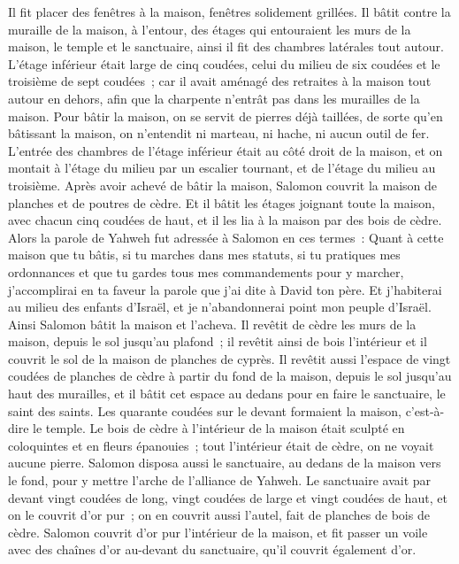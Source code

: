 \begin{multicols}{2}
Il fit placer des fenêtres à la maison, fenêtres solidement grillées.
Il bâtit contre la muraille de la maison, à l'entour, des étages qui entouraient les murs de la maison, le temple et le sanctuaire, ainsi il fit des chambres latérales tout autour.
L'étage inférieur était large de cinq coudées, celui du milieu de six coudées et le troisième de sept coudées~; car il avait aménagé des retraites à la maison tout autour en dehors, afin que la charpente n'entrât pas dans les murailles de la maison.
Pour bâtir la maison, on se servit de pierres déjà taillées, de sorte qu'en bâtissant la maison, on n'entendit ni marteau, ni hache, ni aucun outil de fer.
L'entrée des chambres de l'étage inférieur était au côté droit de la maison, et on montait à l'étage du milieu par un escalier tournant, et de l'étage du milieu au troisième.
Après avoir achevé de bâtir la maison, Salomon couvrit la maison de planches et de poutres de cèdre.
Et il bâtit les étages joignant toute la maison, avec chacun cinq coudées de haut, et il les lia à la maison par des bois de cèdre.
Alors la parole de Yahweh fut adressée à Salomon en ces termes~:
Quant à cette maison que tu bâtis, si tu marches dans mes statuts, si tu pratiques mes ordonnances et que tu gardes tous mes commandements pour y marcher, j'accomplirai en ta faveur la parole que j'ai dite à David ton père.
Et j'habiterai au milieu des enfants d'Israël, et je n'abandonnerai point mon peuple d'Israël.
Ainsi Salomon bâtit la maison et l'acheva.
Il revêtit de cèdre les murs de la maison, depuis le sol jusqu'au plafond~; il revêtit ainsi de bois l'intérieur et il couvrit le sol de la maison de planches de cyprès.
Il revêtit aussi l'espace de vingt coudées de planches de cèdre à partir du fond de la maison, depuis le sol jusqu'au haut des murailles, et il bâtit cet espace au dedans pour en faire le sanctuaire, le saint des saints.
Les quarante coudées sur le devant formaient la maison, c'est-à-dire le temple.
Le bois de cèdre à l'intérieur de la maison était sculpté en coloquintes et en fleurs épanouies~; tout l'intérieur était de cèdre, on ne voyait aucune pierre.
Salomon disposa aussi le sanctuaire, au dedans de la maison vers le fond, pour y mettre l'arche de l'alliance de Yahweh.
Le sanctuaire avait par devant vingt coudées de long, vingt coudées de large et vingt coudées de haut, et on le couvrit d'or pur~; on en couvrit aussi l'autel, fait de planches de bois de cèdre.
Salomon couvrit d'or pur l'intérieur de la maison, et fit passer un voile avec des chaînes d'or au-devant du sanctuaire, qu'il couvrit également d'or.

\end{multicols}
